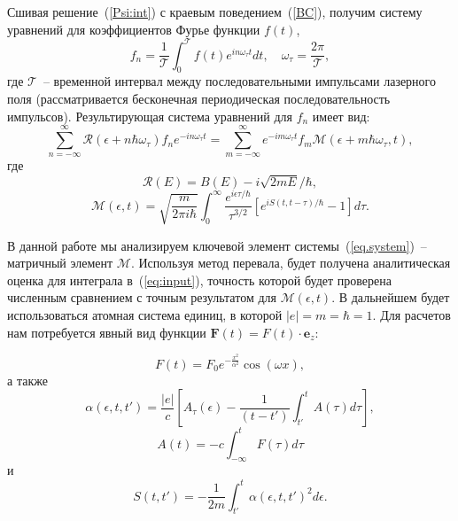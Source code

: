 \documentclass[%
bachelor,    %
natbib,      %
subf,        %
href,        %
colorlinks,  %
]{disser}
\newcommand{\vF}{\mathbf{F}}
\newcommand{\ve}{\mathbf{e}}
\newcommand{\cR}{\mathcal{R}}
\newcommand{\cM}{\mathcal{M}}
\newcommand{\cT}{\mathcal{T}}
\begin{document}
Сшивая решение~(\ref{Psi:int}) с краевым поведением~(\ref{BC}), получим систему уравнений для коэффициентов Фурье функции $f(t)$, 
\begin{equation}
\label{forier:f}
f_n=\frac{1}{\cT}\int_0^{\cT} f(t) e^{in\omega_\tau t}dt,\quad \omega_\tau = \frac{2\pi}{\cT}, 
\end{equation}
где $\cT$~-- временной интервал между последовательными импульсами лазерного поля (рассматривается бесконечная периодическая последовательность импульсов).\cite{main}
Результирующая система уравнений для $f_n$ имеет вид:
\begin{equation}
\label{eq.system}
\sum_{n=-\infty}^\infty \cR(\epsilon+n\hbar\omega_\tau)f_ne^{-in\omega_\tau t} = \sum_{m=-\infty}^\infty e^{-im\omega_\tau t} f_m \cM(\epsilon+m\hbar\omega_\tau,t),
\end{equation}
где
\begin{equation}
\label{R}
\cR(E) = B(E) - i\sqrt{2mE}/\hbar,
\end{equation}
\begin{equation}
\label{eq:input}
\cM(\epsilon,t) = \sqrt{\frac{m}{2\pi i\hbar}}\int_0^{\infty}
\frac{e^{i\epsilon\tau/\hbar}}{\tau^{3/2}}[e^{iS(t,t-\tau)/\hbar}-1]d\tau.
\end{equation}

В данной работе мы анализируем ключевой элемент системы~(\ref{eq.system})~-- матричный элемент $\cM$. Используя метод перевала, будет получена аналитическая оценка для интеграла в~(\ref{eq:input}), точность которой будет проверена численным сравнением с точным результатом для $\cM(\epsilon,t)$. В дальнейшем будет использоваться атомная система единиц, в которой $|e|=m=\hbar=1$.
Для расчетов нам потребуется явный вид функции $\vF (t) = F(t)\cdot\ve_z$:

\begin{equation}\label{eq:f}
F(t) =  F_0 e^{ -\frac{x^2}{\alpha^2} }  \cos(\omega x),
\end{equation}
а также 
\begin{equation}\label{eq:alpha}
\alpha(\epsilon, t, t') = \frac{|e|}{c} [A_{\tau}(\epsilon) - \frac{1}{(t-t')}\int_{t'}^{t}A(\tau) d\tau],
\end{equation}
\begin{equation}\label{eq:a}
A(t) = -c\int_{-\infty}^{t} F(\tau) d\tau
\end{equation}
и 
\begin{equation}\label{eq:s}
S(t, t') = -\frac{1}{2m}\int_{t'}^{t} \alpha(\epsilon, t, t')^2 d\epsilon.
\end{equation}
\end{document}

